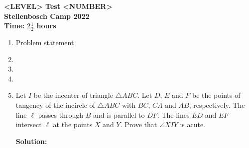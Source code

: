 \documentclass{article}
\begin{document}
\thispagestyle{empty}

\begin{center}
  \textbf{\Large <LEVEL> Test <NUMBER>}
  \\ \vspace{1em}
  \textbf{\large Stellenbosch Camp 2022}
  \\ \vspace{1em}
  \textbf{\large Time: $2\frac{1}{2}$ hours}
\end{center}

\bigskip

\begin{enumerate}[itemsep=\fill]

\item %
Problem statement


\item %


\item %


\item %


\item %
Let $I$ be the incenter of triangle $\triangle ABC$.
Let $D$, $E$ and $F$ be the points of tangency of the incircle of $\triangle ABC$ with $BC$, $CA$ and $AB$, respectively.
The line $\ell$ passes through $B$ and is parallel to $DF$.
The lines $ED$ and $EF$ intersect $\ell$ at the points $X$ and $Y$.
Prove that $\angle XIY$ is acute.

\textbf{Solution:} 



\begin{center}


\end{center}
\end{enumerate}
\end{document}
